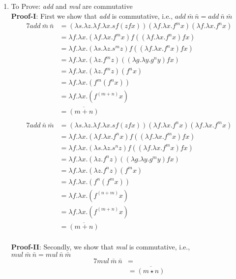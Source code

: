 \documentclass[11pt]{article}
\begin{document}
\begin{enumerate}
\begin{enumerate}
        \item To Prove: \textit{add} and \textit{mul} are commutative\\
    \textbf{Proof-I}: First we show that \textit{add}  is commutative, i.e., $add\: \bar{m} \: \bar{n}=add\:\bar{n} \: \bar{m}$ \\
    \begin{alignat*}{7}
    add\:\bar{m}\:\bar{n}  &= (\lambda s.\lambda z.\lambda f.\lambda x. s f (z f x))(\lambda f.\lambda x. f^m x)(\lambda f.\lambda x. f^n x)\\
     &= \lambda f.\lambda x. (\lambda f.\lambda x. f^m x) f ((\lambda f.\lambda x. f^n x)f x)\\
    &= \lambda f.\lambda x. (\lambda s.\lambda z. s^m z) f ((\lambda f.\lambda x. f^n x)f x)\\
    &= \lambda f.\lambda x. (\lambda z. f^m z)((\lambda g.\lambda y. g^n y)f x)\\
    &= \lambda f.\lambda x. (\lambda z. f^m z)(f^n x)\\
    &= \lambda f.\lambda x. ( f^m (f^n x))\\
    &= \lambda f.\lambda x. ( f^{(m+n)} x)\\
                    &= \overline{(m+n)}\\
    \end{alignat*}
        \begin{alignat*}{7}
    add\:\bar{n}\:\bar{m}  &= (\lambda s.\lambda z.\lambda f.\lambda x. s f (z f x))(\lambda f.\lambda x. f^n x)(\lambda f.\lambda x. f^m x)\\
     &= \lambda f.\lambda x. (\lambda f.\lambda x. f^n x) f ((\lambda f.\lambda x. f^m x)f x)\\
    &= \lambda f.\lambda x. (\lambda s.\lambda z. s^n z) f ((\lambda f.\lambda x. f^m x)f x)\\
    &= \lambda f.\lambda x. (\lambda z. f^n z)((\lambda g.\lambda y. g^m y)f x)\\
    &= \lambda f.\lambda x. (\lambda z. f^n z)(f^m x)\\
    &= \lambda f.\lambda x. ( f^n (f^m x))\\
    &= \lambda f.\lambda x. ( f^{(n+m)} x)\\
    &= \lambda f.\lambda x. ( f^{(m+n)} x)\\
                    &= \overline{(m+n)}\\
    \end{alignat*}
    
\textbf{Proof-II}: Secondly, we show that \textit{mul}  is commutative, i.e.,$mul\: \bar{m} \: \bar{n}=mul\:\bar{n} \: \bar{m}$ \\
    \begin{alignat*}{7}
    mul\:\bar{m}\:\bar{n}  &= \\
    &= \overline{(m\star n)}\\
    \end{alignat*}

\end{enumerate}
\end{enumerate}
\end{document}
